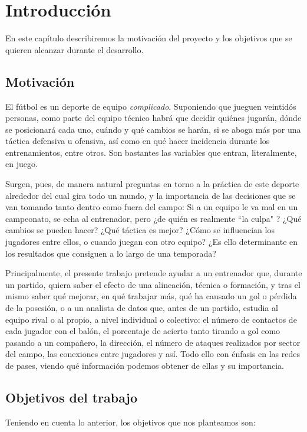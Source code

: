 \chapter{Introducción}
En este capítulo describiremos la motivación del proyecto y los objetivos que
se quieren alcanzar durante el desarrollo. 

\section{Motivación}
El fútbol es un deporte de equipo  \textit{complicado}. Suponiendo que 
jueguen veintidós personas, como parte del equipo técnico habrá que 
decidir quiénes jugarán, dónde se posicionará cada uno, cuándo y qué 
cambios se harán, si se aboga más por una táctica defensiva u ofensiva, 
así como en qué hacer incidencia durante los entrenamientos, entre otros. 
Son bastantes las variables que entran, literalmente, en juego. 

Surgen, pues, de manera natural preguntas en torno a la práctica de 
este deporte alrededor del cual gira todo un mundo, y la importancia 
de las decisiones que se van tomando tanto dentro como fuera del 
campo: Si a un equipo le va mal en un campeonato, se echa al entrenador, pero ¿de quién 
es realmente ``la culpa" \cite{cambio-entrenador}? ¿Qué cambios se pueden hacer? 
¿Qué táctica es mejor? ¿Cómo se influencian los 
jugadores entre ellos, o cuando juegan con otro equipo? ¿Es ello determinante en los 
resultados que consiguen a lo largo de una temporada?

Principalmente, el presente trabajo pretende ayudar a un 
entrenador que, durante un partido, quiera saber el efecto de una 
alineación, técnica o formación, y tras el mismo saber 
qué mejorar, en qué trabajar más, qué ha causado un gol o pérdida 
de la posesión, o a un analista de datos que, antes de un partido, 
estudia al equipo rival o al propio, a nivel individual o colectivo: 
el número de contactos de cada jugador con el balón, el porcentaje 
de acierto tanto tirando a gol como pasando a un compañero, la 
dirección, el número de ataques realizados por sector del campo, 
las conexiones entre jugadores y así. Todo ello con énfasis en las 
redes de pases, viendo qué información podemos obtener de ellas y su 
importancia. 

\section{Objetivos del trabajo} \label{sect:goals}
Teniendo en cuenta lo anterior, los objetivos que nos planteamos son:

